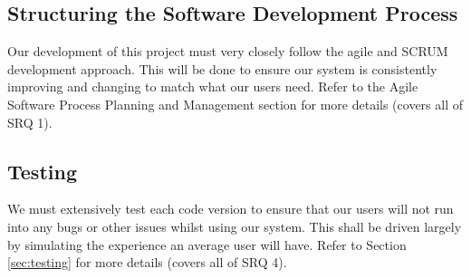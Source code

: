 \documentclass[11pt]{article}
\begin{document}
\subsection{Structuring the Software Development Process}

Our development of this project must very closely follow the agile and SCRUM
development approach. This will be done to ensure our system is consistently
improving and changing to match what our users need. Refer to the Agile Software
Process Planning and Management section for more details (covers all of SRQ 1).

\subsection{Testing}

We must extensively test each code version to ensure that our users will not run
into any bugs or other issues whilst using our system. This shall be driven
largely by simulating the experience an average user will have. Refer to
Section \ref{sec:testing} for more details (covers all of SRQ 4).

\newpage
\end{document}
